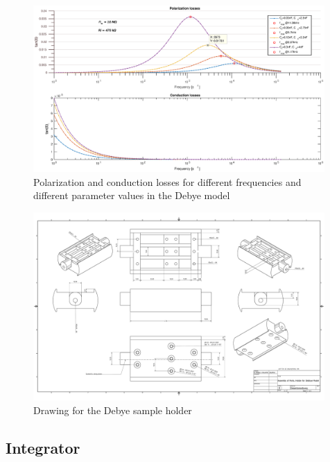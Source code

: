 \begin{figure}
\includegraphics[width=0.99\textwidth]{figures/Method/Dielectric_loss/polarizationmultiple.eps}
    \caption{Polarization and conduction losses for different frequencies and different parameter values in the Debye model}
    \label{fig.debye-modell}
   \end{figure}

   
   \begin{figure}
\includegraphics[width=0.99\textwidth]{figures/Gesamtanordnung.pdf}
    \caption{Drawing for the Debye sample holder}
    \label{fig.CADdrawing}
   \end{figure}

\subsection{Integrator}
